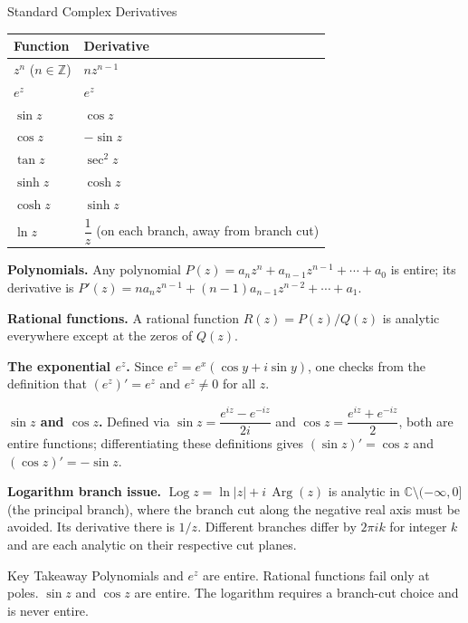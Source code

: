 \documentclass[12pt,a4paper]{article}
\begin{document}
\begin{infobox}{Standard Complex Derivatives}
\begin{tabular}{@{}ll@{}}
\toprule
\textbf{Function} & \textbf{Derivative} \\
\midrule
$z^n$ ($n \in \mathbb{Z}$) & $nz^{n-1}$ \\[4pt]
$e^z$ & $e^z$ \\[4pt]
$\sin z$ & $\cos z$ \\[4pt]
$\cos z$ & $-\sin z$ \\[4pt]
$\tan z$ & $\sec^2 z$ \\[4pt]
$\sinh z$ & $\cosh z$ \\[4pt]
$\cosh z$ & $\sinh z$ \\[4pt]
$\ln z$ & $\dfrac{1}{z}$ (on each branch, away from branch cut) \\
\bottomrule
\end{tabular}
\end{infobox}

\noindent\textbf{Polynomials.}
Any polynomial $P(z) = a_n z^n + a_{n-1}z^{n-1} + \cdots + a_0$ is entire;
its derivative is $P'(z) = n a_n z^{n-1} + (n-1)a_{n-1}z^{n-2} + \cdots + a_1$.

\medskip\noindent\textbf{Rational functions.}
A rational function $R(z) = P(z)/Q(z)$ is analytic everywhere except at the zeros
of $Q(z)$.

\medskip\noindent\textbf{The exponential $e^z$.}
Since $e^z = e^x(\cos y + i\sin y)$, one checks from the definition that
$(e^z)' = e^z$ and $e^z \neq 0$ for all $z$.

\medskip\noindent\textbf{$\sin z$ and $\cos z$.}
Defined via $\sin z = \dfrac{e^{iz}-e^{-iz}}{2i}$ and
$\cos z = \dfrac{e^{iz}+e^{-iz}}{2}$, both are entire functions;
differentiating these definitions gives $(\sin z)' = \cos z$ and $(\cos z)' = -\sin z$.

\medskip\noindent\textbf{Logarithm branch issue.}
$\operatorname{Log} z = \ln|z| + i\,\operatorname{Arg}(z)$ is analytic in
$\mathbb{C} \setminus (-\infty, 0]$ (the principal branch), where the branch cut
along the negative real axis must be avoided. Its derivative there is $1/z$.
Different branches differ by $2\pi i k$ for integer $k$ and are each analytic on
their respective cut planes.

\begin{learnbox}{Key Takeaway}
Polynomials and $e^z$ are entire. Rational functions fail only at poles.
$\sin z$ and $\cos z$ are entire. The logarithm requires a branch-cut choice
and is never entire.
\end{learnbox}
\end{document}
